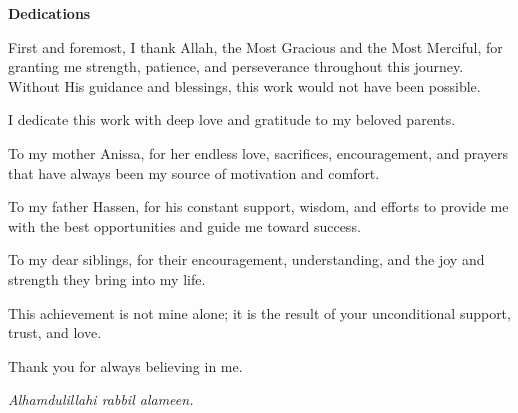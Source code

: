 \thispagestyle{plain}
\begin{center}
    {\Large \textbf{Dedications}}
\end{center}

\vspace*{0.6cm}



First and foremost, I thank Allah, the Most Gracious and the Most Merciful, for granting me strength, patience, and perseverance throughout this journey. Without His guidance and blessings, this work would not have been possible.

I dedicate this work with deep love and gratitude to my beloved parents.

To my mother Anissa, for her endless love, sacrifices, encouragement, and prayers that have always been my source of motivation and comfort.

To my father Hassen, for his constant support, wisdom, and efforts to provide me with the best opportunities and guide me toward success.

To my dear siblings, for their encouragement, understanding, and the joy and strength they bring into my life.

This achievement is not mine alone; it is the result of your unconditional support, trust, and love.

Thank you for always believing in me.

\vfill

\hfill \textit{Alhamdulillahi rabbil alameen.}